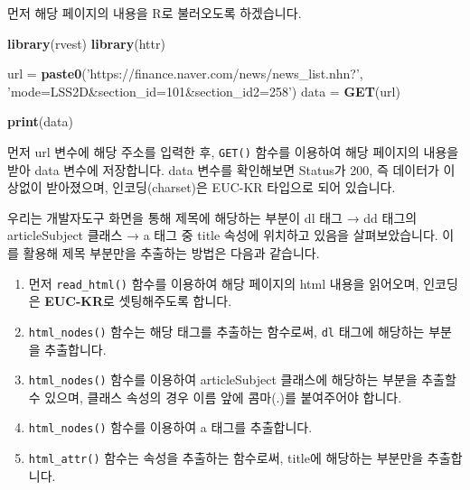 \documentclass[12pt,]{book}
\newenvironment{Shaded}{\begin{snugshade}}{\end{snugshade}}
\newcommand{\DataTypeTok}[1]{\textcolor[rgb]{0.13,0.29,0.53}{#1}}
\newcommand{\KeywordTok}[1]{\textcolor[rgb]{0.13,0.29,0.53}{\textbf{#1}}}
\newcommand{\NormalTok}[1]{#1}
\newcommand{\OperatorTok}[1]{\textcolor[rgb]{0.81,0.36,0.00}{\textbf{#1}}}
\newcommand{\StringTok}[1]{\textcolor[rgb]{0.31,0.60,0.02}{#1}}
\providecommand{\tightlist}{%
  \setlength{\itemsep}{0pt}\setlength{\parskip}{0pt}}
\begin{document}
먼저 해당 페이지의 내용을 R로 불러오도록 하겠습니다.

\begin{Shaded}
\begin{Highlighting}[]
\KeywordTok{library}\NormalTok{(rvest)}
\KeywordTok{library}\NormalTok{(httr)}

\NormalTok{url =}\StringTok{ }\KeywordTok{paste0}\NormalTok{(}\StringTok{'https://finance.naver.com/news/news_list.nhn?'}\NormalTok{,}
             \StringTok{'mode=LSS2D&section_id=101&section_id2=258'}\NormalTok{)}
\NormalTok{data =}\StringTok{ }\KeywordTok{GET}\NormalTok{(url)}

\KeywordTok{print}\NormalTok{(data)}
\end{Highlighting}
\end{Shaded}

먼저 url 변수에 해당 주소를 입력한 후, \texttt{GET()} 함수를 이용하여 해당 페이지의 내용을 받아 data 변수에 저장합니다. data 변수를 확인해보면 Status가 200, 즉 데이터가 이상없이 받아졌으며, 인코딩(charset)은 EUC-KR 타입으로 되어 있습니다.

우리는 개발자도구 화면을 통해 제목에 해당하는 부분이 dl 태그 → dd 태그의 articleSubject 클래스 → a 태그 중 title 속성에 위치하고 있음을 살펴보았습니다. 이를 활용해 제목 부분만을 추출하는 방법은 다음과 같습니다.

\begin{Shaded}
\end{Shaded}

\begin{enumerate}
\def\labelenumi{\arabic{enumi}.}
\tightlist
\item
  먼저 \texttt{read\_html()} 함수를 이용하여 해당 페이지의 html 내용을 읽어오며, 인코딩은 \textbf{EUC-KR}로 셋팅해주도록 합니다.
\item
  \texttt{html\_nodes()} 함수는 해당 태그를 추출하는 함수로써, \texttt{dl} 태그에 해당하는 부분을 추출합니다.
\item
  \texttt{html\_nodes()} 함수를 이용하여 articleSubject 클래스에 해당하는 부분을 추출할 수 있으며, 클래스 속성의 경우 이름 앞에 콤마(.)를 붙여주어야 합니다.
\item
  \texttt{html\_nodes()} 함수를 이용하여 a 태그를 추출합니다.
\item
  \texttt{html\_attr()} 함수는 속성을 추출하는 함수로써, title에 해당하는 부분만을 추출합니다.
\end{enumerate}
\end{document}
